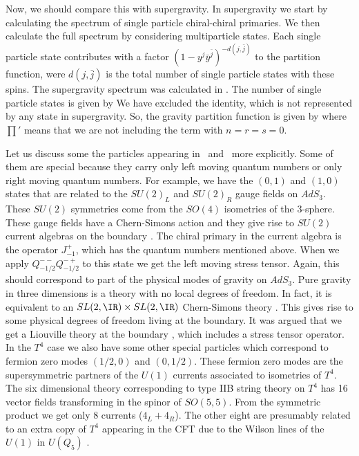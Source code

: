 Now, we should compare this with supergravity. 
In supergravity we start by calculating the spectrum 
of single particle chiral-chiral primaries. 
We then calculate the full spectrum by considering multiparticle states.
Each single particle state  contributes with a factor 
$(1- y^{j} {\bar y}^{\bar j})^{-d(j,\bar j)} $ to the partition function,
were $d(j,\bar j)$ is the total number of single particle states with 
these spins.
The supergravity spectrum was calculated in 
\cite{Maldacena:1998bw,Deger:1998nm,Larsen:1998xm,deBoer:1998ip}.
The number of single particle states is given by 
We  have excluded  the identity, which is not represented by any state
in supergravity.
So, the gravity partition function is given by 
where $\prod'$ means that we are not including the term with $n=r=s=0$. 

Let us discuss some the particles appearing in \grav\ and \gravitypa\
 more explicitly.
Some of them are special because
 they carry only left moving quantum numbers or only right moving
quantum numbers. For example, we have the $(0,1)$ and $(1,0)$ states
that are related to the $SU(2)_L$ and $SU(2)_R $ gauge fields on $AdS_3$.
These $SU(2)$ symmetries come from the $SO(4)$ isometries of the 
3-sphere. 
These gauge fields have a Chern-Simons action 
\cite{Achucarro:1986vz,Achucarro:1989gm} and they 
give rise to $SU(2)$ current algebras on the boundary 
\cite{Witten:1989hf,Elitzur:1989nr}. 
The chiral primary in the current algebra is the operator
$J_{-1}^+$, which has the quantum numbers mentioned above. 
When we apply $Q^{--}_{-1/2} Q^{-+}_{-1/2}$ to this state we 
get the left moving stress tensor. Again, this should correspond to part 
of the physical modes of gravity on $AdS_3$. Pure gravity in three
dimensions is a theory with no local degrees of freedom. 
In fact, it is equivalent to an $SL(2,\IR)\times SL(2,\IR)$ Chern-Simons
theory 
\cite{Achucarro:1986vz,Howe:1996zm,%
Witten:1988hc,Witten:1989sx}.
 This gives rise to some physical degrees of freedom
living at the boundary. It was argued that we get a Liouville
theory at the boundary 
\cite{Coussaert:1995zp,Banados:1998pi,Banados:1998ta,%
Banados:1996tn,Martinec:1998st}, which includes a stress tensor
operator.
In the $T^4$ case we also have some other special particles
which correspond to fermion zero modes $(1/2,0)$ and $(0,1/2)$. 
These fermion zero modes are the supersymmetric partners of the $U(1)$ 
currents associated to isometries of $T^4$.
The six dimensional  theory corresponding to type IIB string theory on
$T^4$ has 16 vector fields transforming
in the spinor  of $SO(5,5)$. From the symmetric product we get only
8 currents ($4_L + 4_R$). The other eight are presumably related to
an extra copy of $T^4$ appearing in the CFT due to the Wilson
lines of the $U(1)$ in $U(Q_5) $ \cite{Maldacena:1999bp,Larsen:1999uk}.  

